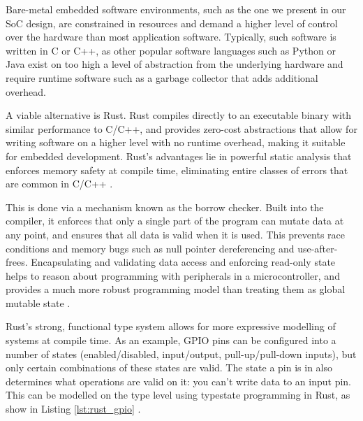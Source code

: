 Bare-metal embedded software environments, such as the one we present in our SoC design, are constrained in resources and demand a higher level of control over the hardware than most application software. Typically, such software is written in C or C++, as other popular software languages such as Python or Java exist on too high a level of abstraction from the underlying hardware and require runtime software such as a garbage collector that adds additional overhead.

A viable alternative is Rust. Rust compiles directly to an executable binary with similar performance to C/C++, and provides zero-cost abstractions that allow for writing software on a higher level with no runtime overhead, making it suitable for embedded development. Rust's advantages lie in powerful static analysis that enforces memory safety at compile time, eliminating entire classes of errors that are common in C/C++ \cite{rust-paper}.

This is done via a mechanism known as the borrow checker. Built into the compiler, it enforces that only a single part of the program can mutate data at any point, and ensures that all data is valid when it is used. This prevents race conditions and memory bugs such as null pointer dereferencing and use-after-frees. Encapsulating and validating data access and enforcing read-only state helps to reason about programming with peripherals in a microcontroller, and provides a much more robust programming model than treating them as global mutable state \cite{rust-usability, rust-good}.

Rust's strong, functional type system allows for more expressive modelling of systems at compile time. As an example, GPIO pins can be configured into a number of states (enabled/disabled, input/output, pull-up/pull-down inputs), but only certain combinations of these states are valid. The state a pin is in also determines what operations are valid on it: you can't write data to an input pin. This can be modelled on the type level using typestate programming in Rust, as show in Listing \ref{lst:rust_gpio} \cite{embedded_rust}.

